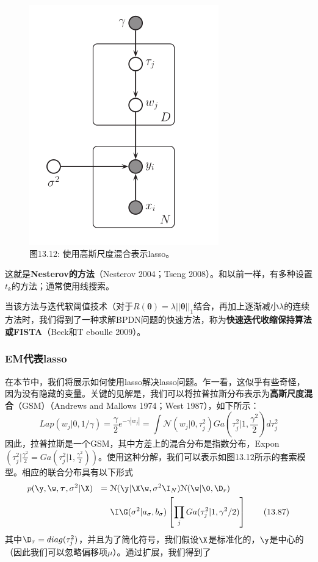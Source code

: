 \documentclass[a4paper]{article}
\begin{document}
\begin{figure}[h]
	\centering
	\includegraphics[width=0.5\linewidth]{fig13/figure12}
	\caption*{图13.12: 使用高斯尺度混合表示lasso。}
\end{figure}
这就是\textbf{Nesterov的方法}（Nesterov 2004；Tseng 2008）。和以前一样，有多种设置$t_k$的方法；通常使用线搜索。

当该方法与迭代软阈值技术（对于$R(\boldsymbol{\theta})=\lambda||\boldsymbol{\theta}||_1$结合，再加上逐渐减小$\lambda$的连续方法时，我们得到了一种求解BPDN问题的快速方法，称为\textbf{快速迭代收缩保持算法或FISTA}（Beck和T eboulle 2009）。

\subsubsection{EM代表lasso}
在本节中，我们将展示如何使用lasso解决lasso问题。乍一看，这似乎有些奇怪，因为没有隐藏的变量。关键的见解是，我们可以将拉普拉斯分布表示为\textbf{高斯尺度混合}（GSM）（Andrews and Mallows 1974；West 1987），如下所示：
\begin{equation}
	Lap(w_j|0,1/\gamma)=\frac{\gamma}{2}e^{-\gamma|w_j|}=\int \mathcal{N}(w_j|0,\tau_j^2)Ga(\tau_j^2|1,\frac{\gamma^2}{2})d\tau_j^2\tag{13.86}
\end{equation}
因此，拉普拉斯是一个GSM，其中方差上的混合分布是指数分布，Expon$(\tau_j^2|\frac{\gamma^2}{2}=Ga(\tau_j^2|1,\frac{\gamma^2}{2}))$。使用这种分解，我们可以表示如图13.12所示的套索模型。相应的联合分布具有以下形式
\begin{align}
	p(\y,\w,\boldsymbol{\tau},\sigma^2|\X )\ \ =\ &\mathcal{N}(\y|\X\w,\sigma^2\I_N)\mathcal{N}(\w|\0,\D_r)\tag*{}\\
	&\I\G(\sigma^2|a_\sigma,b_\sigma)\left[\prod_j Ga(\tau_j^2|1,\gamma^2/2) \right]\tag{13.87}
\end{align}
其中$\D_\tau =diag(\tau_j^2)$，并且为了简化符号，我们假设$\X$是标准化的，$\y$是中心的（因此我们可以忽略偏移项$\mu$）。通过扩展，我们得到了
\end{document}
